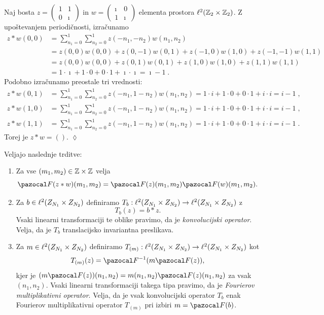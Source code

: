 \begin{primer}
Naj bosta
$z = \left(\begin{smallmatrix}
  1 & 1\\
  0 & \imath
\end{smallmatrix} \right)$
in
$w = \left(\begin{smallmatrix}
  \imath & 0\\
  1 & \imath
\end{smallmatrix} \right)$
elementa prostora $\ell^2(\mathbb Z_2 \times \mathbb Z_2)$. Z upoštevanjem periodičnosti, izračunamo
%
\begin{align*}
z \ast w(0, 0) & = \sum_{n_1 = 0}^1 \sum_{n_2 = 0}^1 z(- n_1, - n_2) w(n_1, n_2) \\
& = z(0, 0) w(0, 0) + z(0, -1) w(0, 1) + z(-1, 0) w(1, 0)+ z(-1, -1) w(1, 1) \\
& = z(0, 0) w(0, 0) + z(0, 1) w(0, 1) + z(1, 0) w(1, 0)+ z(1, 1) w(1, 1) \\
& = 1 \cdot \imath + 1 \cdot 0 + 0 \cdot 1 + \imath \cdot \imath = \imath - 1 \;.
\end{align*}
%
Podobno izračunamo preostale tri vrednosti:
%
\begin{align*}
z \ast w(0, 1) & = \sum_{n_1 = 0}^1 \sum_{n_2 = 0}^1 z(- n_1, 1 - n_2) w(n_1, n_2) = 1 \cdot i + 1 \cdot 0 + 0 \cdot 1 + i \cdot i = i - 1 \;, \\
z \ast w(1, 0) & = \sum_{n_1 = 0}^1 \sum_{n_2 = 0}^1 z(- n_1, 1 - n_2) w(n_1, n_2) = 1 \cdot i + 1 \cdot 0 + 0 \cdot 1 + i \cdot i = i - 1 \;, \\
z \ast w(1, 1) & = \sum_{n_1 = 0}^1 \sum_{n_2 = 0}^1 z(- n_1, 1 - n_2) w(n_1, n_2) = 1 \cdot i + 1 \cdot 0 + 0 \cdot 1 + i \cdot i = i - 1 \;.
\end{align*}
%
Torej je $z \ast w = ()$. \hfill $\lozenge$
\end{primer}
%
\begin{izrek}
Veljajo naslednje trditve:
\begin{enumerate}
\item Za vse $(m_1, m_2) \in \mathbb Z \times \mathbb Z$ velja
$$\F(z \ast w)(m_1, m_2) = \F(z)(m_1, m_2) \F(w)(m_1, m_2).$$
\item Za $b \in \ell^2(Z_{N_1} \times Z_{N_2})$ definiramo $T_b : \ell^2(Z_{N_1} \times Z_{N_2}) \to \ell^2(Z_{N_1} \times Z_{N_2})$ z
$$T_b(z) = b \ast z.$$
Vsaki linearni transformaciji te oblike pravimo, da je \emph{konvolucijski operator}. Velja, da je $T_b$ translacijsko invariantna preslikava.
\item Za $m \in \ell^2(Z_{N_1} \times Z_{N_2})$ definiramo $T_{(m)} : \ell^2(Z_{N_1} \times Z_{N_2}) \to \ell^2(Z_{N_1} \times Z_{N_2})$ kot
$$T_{(m)}(z) = \F^{-1}(m\F(z)),$$
kjer je $(m\F(z))(n_1, n_2) = m(n_1, n_2)\F(z)(n_1, n_2)$ za vsak $(n_1, n_2)$. Vsaki linearni transformaciji takega tipa pravimo, da je \emph{Fourierov multiplikativni operator}. Velja, da je vsak konvolucijski operator $T_b$ enak Fourierov multiplikativni operator $T_{(m)}$ pri izbiri $m = \F(b)$.
\end{enumerate}
\end{izrek}
